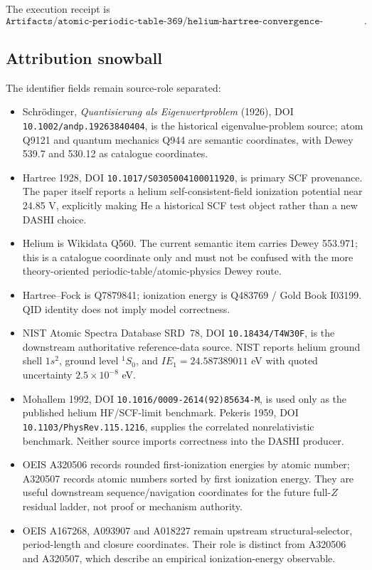 The execution receipt is
\[
\texttt{Artifacts/atomic-periodic-table-369/helium-hartree-convergence-receipt.json}.
\]

\subsection{Attribution snowball}

The identifier fields remain source-role separated:

\begin{itemize}
\item Schr\"odinger, \emph{Quantisierung als Eigenwertproblem} (1926), DOI
  \texttt{10.1002/andp.19263840404}, is the historical eigenvalue-problem
  source; atom Q9121 and quantum mechanics Q944 are semantic coordinates, with
  Dewey 539.7 and 530.12 as catalogue coordinates.
\item Hartree 1928, DOI \texttt{10.1017/S0305004100011920}, is primary SCF
  provenance. The paper itself reports a helium self-consistent-field
  ionization potential near 24.85 V, explicitly making He a historical SCF
  test object rather than a new DASHI choice.
\item Helium is Wikidata Q560. The current semantic item carries Dewey 553.971;
  this is a catalogue coordinate only and must not be confused with the more
  theory-oriented periodic-table/atomic-physics Dewey route.
\item Hartree--Fock is Q7879841; ionization energy is Q483769 / Gold Book
  I03199. QID identity does not imply model correctness.
\item NIST Atomic Spectra Database SRD~78, DOI \texttt{10.18434/T4W30F}, is the
  downstream authoritative reference-data source. NIST reports helium ground
  shell $1s^2$, ground level $^1S_0$, and $IE_1=24.587389011$ eV with quoted
  uncertainty $2.5\times10^{-8}$ eV.
\item Mohallem 1992, DOI \texttt{10.1016/0009-2614(92)85634-M}, is used only as
  the published helium HF/SCF-limit benchmark. Pekeris 1959, DOI
  \texttt{10.1103/PhysRev.115.1216}, supplies the correlated nonrelativistic
  benchmark. Neither source imports correctness into the DASHI producer.
\item OEIS A320506 records rounded first-ionization energies by atomic number;
  A320507 records atomic numbers sorted by first ionization energy. They are
  useful downstream sequence/navigation coordinates for the future full-$Z$
  residual ladder, not proof or mechanism authority.
\item OEIS A167268, A093907 and A018227 remain upstream structural-selector,
  period-length and closure coordinates. Their role is distinct from A320506
  and A320507, which describe an empirical ionization-energy observable.
\end{itemize}

